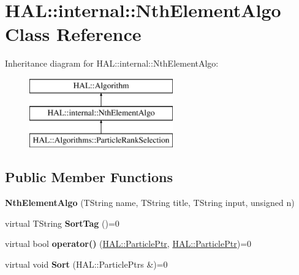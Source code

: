 \hypertarget{class_h_a_l_1_1internal_1_1_nth_element_algo}{\section{H\-A\-L\-:\-:internal\-:\-:Nth\-Element\-Algo Class Reference}
\label{class_h_a_l_1_1internal_1_1_nth_element_algo}
}
Inheritance diagram for H\-A\-L\-:\-:internal\-:\-:Nth\-Element\-Algo\-:\begin{figure}[H]
\begin{center}
\leavevmode
\includegraphics[height=3.000000cm]{class_h_a_l_1_1internal_1_1_nth_element_algo}
\end{center}
\end{figure}
\subsection*{Public Member Functions}
\begin{DoxyCompactItemize}
\item 
\hypertarget{class_h_a_l_1_1internal_1_1_nth_element_algo_acdba7eb52a2072cadcfb97fd3de30fd5}{{\bfseries Nth\-Element\-Algo} (T\-String name, T\-String title, T\-String input, unsigned n)}\label{class_h_a_l_1_1internal_1_1_nth_element_algo_acdba7eb52a2072cadcfb97fd3de30fd5}

\item 
\hypertarget{class_h_a_l_1_1internal_1_1_nth_element_algo_adc78b664212ebfdec482eeee1d41bea8}{virtual T\-String {\bfseries Sort\-Tag} ()=0}\label{class_h_a_l_1_1internal_1_1_nth_element_algo_adc78b664212ebfdec482eeee1d41bea8}

\item 
\hypertarget{class_h_a_l_1_1internal_1_1_nth_element_algo_aad75062fe14771f32a837a6f6c8a881a}{virtual bool {\bfseries operator()} (\hyperlink{class_h_a_l_1_1_generic_particle}{H\-A\-L\-::\-Particle\-Ptr}, \hyperlink{class_h_a_l_1_1_generic_particle}{H\-A\-L\-::\-Particle\-Ptr})=0}\label{class_h_a_l_1_1internal_1_1_nth_element_algo_aad75062fe14771f32a837a6f6c8a881a}

\item 
\hypertarget{class_h_a_l_1_1internal_1_1_nth_element_algo_a1ca94a747002fcb75056ef33fe7e6d21}{virtual void {\bfseries Sort} (H\-A\-L\-::\-Particle\-Ptrs \&)=0}\label{class_h_a_l_1_1internal_1_1_nth_element_algo_a1ca94a747002fcb75056ef33fe7e6d21}

\end{DoxyCompactItemize}
